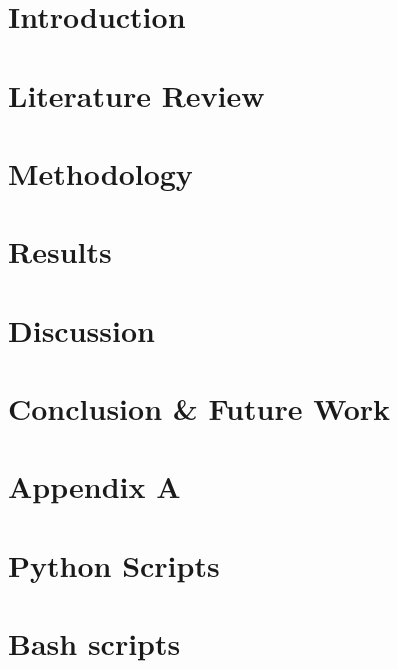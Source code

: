 \documentclass[11pt]{report}
\begin{document}


\newpage
\tableofcontents
\listoffigures
\listoftables
\lstlistoflistings
\newpage

\begin{abstract}
  \lipsum[1-3]
\end{abstract}
\onehalfspacing
\chapter{Introduction}
\lipsum[1-3]
% 
% 

\chapter{Literature Review}
% 


\chapter{Methodology}

\chapter{Results}
\lipsum[1-3]

\chapter{Discussion}
\lipsum[1-3]

\chapter{Conclusion \& Future Work }
\lipsum[1-3]




\appendix
\chapter{Appendix A}
\FloatBarrier
\chapter{Python Scripts}
\label{appPythonScripts}

\FloatBarrier
\chapter{Bash scripts}
\label{appBashScripts}

\clearpage
{}
\printindex
\end{document}
